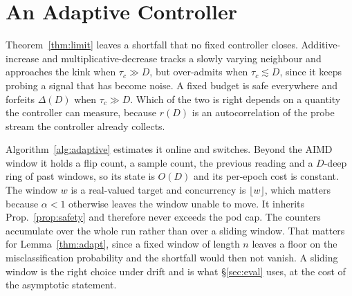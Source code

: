 \section{An Adaptive Controller}
\label{sec:controller}

Theorem~\ref{thm:limit} leaves a shortfall that no fixed controller closes.
Additive-increase and multiplicative-decrease tracks a slowly varying neighbour
and approaches the kink when $\tau_c\gg D$, but over-admits when
$\tau_c\lesssim D$, since it keeps probing a signal that has become noise. A fixed
budget is safe everywhere and forfeits $\Delta(D)$ when $\tau_c\gg D$. Which of
the two is right depends on a quantity the controller can measure, because $r(D)$
is an autocorrelation of the probe stream the controller already collects.

Algorithm~\ref{alg:adaptive} estimates it online and switches. Beyond the AIMD
window it holds a flip count, a sample count, the previous reading and a $D$-deep
ring of past windows, so its state is $O(D)$ and its per-epoch cost is constant.
The window $w$ is a real-valued target and concurrency is $\lfloor w\rfloor$, which
matters because $\alpha<1$ otherwise leaves the window unable to move. It inherits
Prop.~\ref{prop:safety} and therefore never exceeds the pod cap. The counters
accumulate over the whole run rather than over a sliding window. That matters for
Lemma~\ref{thm:adapt}, since a fixed window of length $n$ leaves a floor on the
misclassification probability and the shortfall would then not vanish. A sliding
window is the right choice under drift and is what \S\ref{sec:eval} uses, at the
cost of the asymptotic statement.

